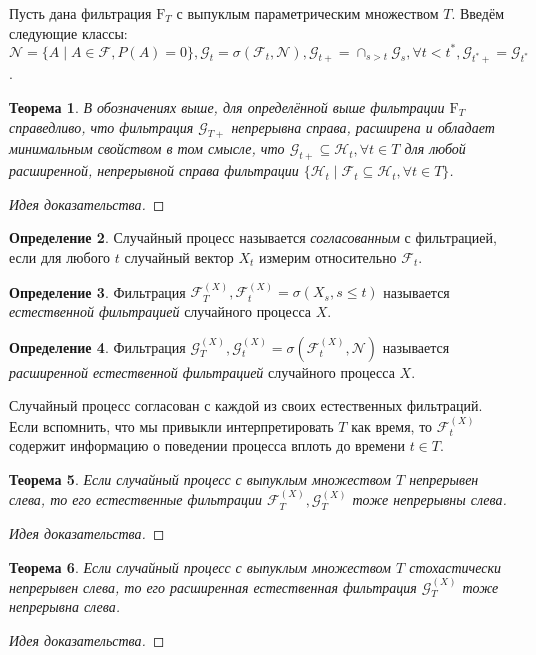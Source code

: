 \documentclass[16pt]{article}
\newtheorem{theorem}{Теорема}[section]
\theoremstyle{definition}
\newtheorem{definition}[theorem]{Определение}
\begin{document}
Пусть дана фильтрация $\mathrm{F}_T$ с выпуклым параметрическим множеством $T$. Введём следующие классы: $\mathcal{N} = \{A \mid A \in \mathcal{F}, P(A) = 0\}, \mathcal{G}_t = \sigma(\mathcal{F}_t, \mathcal{N}), \mathcal{G}_{t+} = \cap_{s > t} \mathcal{G}_s, \forall t < t^*, \mathcal{G}_{t^*+} = \mathcal{G}_{t^*}$.
\begin{theorem}
В обозначениях выше, для определённой выше фильтрации $\mathrm{F}_T$ справедливо, что фильтрация $\mathcal{G}_{T+}$ непрерывна справа, расширена и обладает минимальным свойством в том смысле, что $\mathcal{G}_{t+} \subseteq \mathcal{H}_t, \forall t \in T$ для любой расширенной, непрерывной справа фильтрации $\{\mathcal{H}_t \mid \mathcal{F}_t \subseteq \mathcal{H}_t, \forall t \in T\}$.
\end{theorem}
\begin{proof}[Идея доказательства]

\end{proof}
\begin{definition}
Случайный процесс называется \textit{согласованным} с фильтрацией, если для любого $t$ случайный вектор $X_t$ измерим относительно $\mathcal{F}_t$.
\end{definition}
\begin{definition}
Фильтрация $\mathcal{F}_T^{(X)}, \mathcal{F}_t^{(X)} = \sigma(X_s, s \le t)$ называется \textit{естественной фильтрацией} случайного процесса $X$.
\end{definition}
\begin{definition}
Фильтрация $\mathcal{G}_T^{(X)}, \mathcal{G}_t^{(X)} = \sigma(\mathcal{F}_t^{(X)}, \mathcal{N})$ называется \textit{расширенной естественной фильтрацией} случайного процесса $X$.
\end{definition}
Случайный процесс согласован с каждой из своих естественных фильтраций. Если вспомнить, что мы привыкли интерпретировать $T$ как время, то $\mathcal{F}_t^{(X)}$ содержит информацию о поведении процесса вплоть до времени $t \in T$.
\begin{theorem}
Если случайный процесс с выпуклым множеством $T$ непрерывен слева, то его естественные фильтрации $\mathcal{F}_T^{(X)}, \mathcal{G}_T^{(X)}$ тоже непрерывны слева.
\end{theorem}
\begin{proof}[Идея доказательства]

\end{proof}
\begin{theorem}
Если случайный процесс с выпуклым множеством $T$ стохастически непрерывен слева, то его расширенная естественная фильтрация $\mathcal{G}_T^{(X)}$ тоже непрерывна слева.
\end{theorem}
\begin{proof}[Идея доказательства]

\end{proof}
\end{document}
